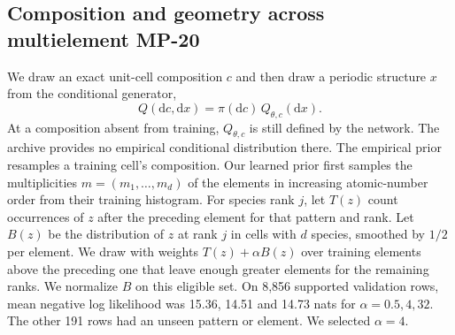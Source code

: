 \subsection{Composition and geometry across multielement MP-20}
We draw an exact unit-cell composition $c$ and then draw a periodic structure $x$ from the conditional generator,
\begin{equation}
 Q(\mathrm dc,\mathrm dx)=\pi(\mathrm dc)\,Q_{\theta,c}(\mathrm dx).
 \label{eq:full-prior}
\end{equation}
At a composition absent from training, $Q_{\theta,c}$ is still defined by the network. The archive provides no empirical conditional distribution there. The empirical prior resamples a training cell's composition. Our learned prior first samples the multiplicities $m=(m_1,\ldots,m_d)$ of the elements in increasing atomic-number order from their training histogram. For species rank $j$, let $T(z)$ count occurrences of $z$ after the preceding element for that pattern and rank. Let $B(z)$ be the distribution of $z$ at rank $j$ in cells with $d$ species, smoothed by $1/2$ per element. We draw with weights $T(z)+\alpha B(z)$ over training elements above the preceding one that leave enough greater elements for the remaining ranks. We normalize $B$ on this eligible set. On 8,856 supported validation rows, mean negative log likelihood was 15.36, 14.51 and 14.73 nats for $\alpha=0.5,4,32$. The other 191 rows had an unseen pattern or element. We selected $\alpha=4$.

